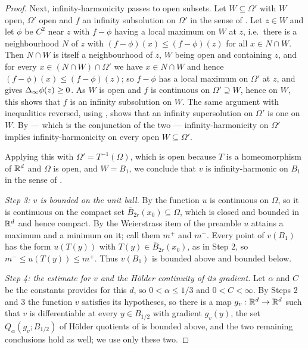 \begin{proof}
Next, infinity-harmonicity passes to open subsets. Let $W\subseteq\Omega'$ with
$W$ open, $\Omega'$ open and $f$ an infinity subsolution on $\Omega'$ in the
sense of . Let $z\in W$ and let $\phi$ be $C^2$ near
$z$ with $f-\phi$ having a local maximum on $W$ at $z$, i.e.\ there is a
neighbourhood $N$ of $z$ with $(f-\phi)(x)\le(f-\phi)(z)$ for all $x\in N\cap W$.
Then $N\cap W$ is itself a neighbourhood of $z$, $W$ being open and containing
$z$, and for every $x\in(N\cap W)\cap\Omega'$ we have $x\in N\cap W$ and hence
$(f-\phi)(x)\le(f-\phi)(z)$; so $f-\phi$ has a local maximum on $\Omega'$ at
$z$, and  gives $\Delta_{\infty}\phi(z)\ge0$. As $W$ is open
and $f$ is continuous on $\Omega'\supseteq W$, hence on $W$, this shows that $f$
is an infinity subsolution on $W$. The same argument with inequalities reversed,
using , shows that an infinity supersolution on
$\Omega'$ is one on $W$. By  — which is the conjunction
of the two — infinity-harmonicity on $\Omega'$ implies infinity-harmonicity on
every open $W\subseteq\Omega'$.

Applying this with $\Omega'=T^{-1}(\Omega)$, which is open because $T$ is a
homeomorphism of $\mathbb{R}^d$ and $\Omega$ is open, and $W=B_1$, we conclude that $v$
is infinity-harmonic on $B_1$ in the sense of .

\emph{Step 3: $v$ is bounded on the unit ball.}
By  the function $u$ is continuous on $\Omega$, so it is
continuous on the compact set $\overline B_{2r}(x_0)\subseteq\Omega$, which is
closed and bounded in $\mathbb{R}^d$ and hence compact. By the Weierstrass item of the
preamble $u$ attains a maximum and a minimum on it; call them $m^+$ and $m^-$.
Every point of $v(B_1)$ has the form $u(T(y))$ with $T(y)\in\overline
B_{2r}(x_0)$, as in Step 2, so $m^-\le u(T(y))\le m^+$. Thus $v(B_1)$ is bounded
above and bounded below.

\emph{Step 4: the estimate for $v$ and the H\"older continuity of its gradient.}
Let $\alpha$ and $C$ be the constants  provides for this
$d$, so $0<\alpha\le1/3$ and $0<C<\infty$. By Steps 2 and 3 the function $v$
satisfies its hypotheses, so there is a map $g_v:\mathbb{R}^d\to\mathbb{R}^d$ such that $v$ is
differentiable at every $y\in B_{1/2}$ with gradient $g_v(y)$, the set
$Q_\alpha(g_v;B_{1/2})$ of H\"older quotients of  is
bounded above, and the two remaining conclusions hold as well; we use only
these two.


\end{proof}
